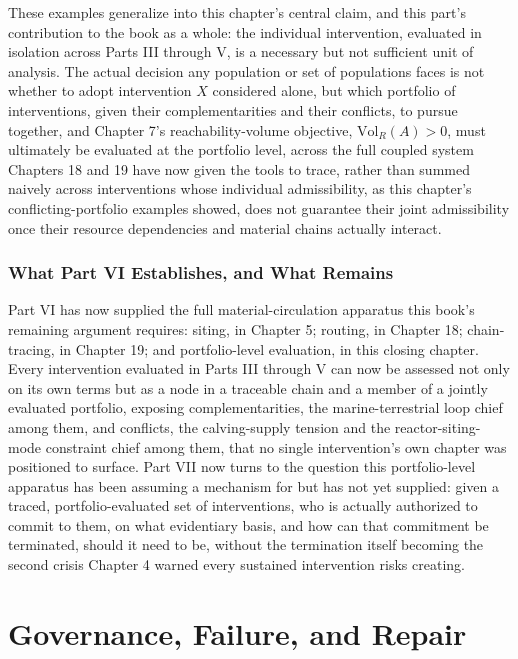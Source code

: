 \documentclass[11pt,oneside]{book}
\begin{document}
These examples generalize into this chapter's central claim, and this part's contribution to the book as a whole: the individual intervention, evaluated in isolation across Parts III through V, is a necessary but not sufficient unit of analysis. The actual decision any population or set of populations faces is not whether to adopt intervention $X$ considered alone, but which portfolio of interventions, given their complementarities and their conflicts, to pursue together, and Chapter 7's reachability-volume objective, $\mathrm{Vol}_R(A) > 0$, must ultimately be evaluated at the portfolio level, across the full coupled system Chapters 18 and 19 have now given the tools to trace, rather than summed naively across interventions whose individual admissibility, as this chapter's conflicting-portfolio examples showed, does not guarantee their joint admissibility once their resource dependencies and material chains actually interact.

\section*{What Part VI Establishes, and What Remains}

Part VI has now supplied the full material-circulation apparatus this book's remaining argument requires: siting, in Chapter 5; routing, in Chapter 18; chain-tracing, in Chapter 19; and portfolio-level evaluation, in this closing chapter. Every intervention evaluated in Parts III through V can now be assessed not only on its own terms but as a node in a traceable chain and a member of a jointly evaluated portfolio, exposing complementarities, the marine-terrestrial loop chief among them, and conflicts, the calving-supply tension and the reactor-siting-mode constraint chief among them, that no single intervention's own chapter was positioned to surface. Part VII now turns to the question this portfolio-level apparatus has been assuming a mechanism for but has not yet supplied: given a traced, portfolio-evaluated set of interventions, who is actually authorized to commit to them, on what evidentiary basis, and how can that commitment be terminated, should it need to be, without the termination itself becoming the second crisis Chapter 4 warned every sustained intervention risks creating.

\part{Governance, Failure, and Repair}
\end{document}
